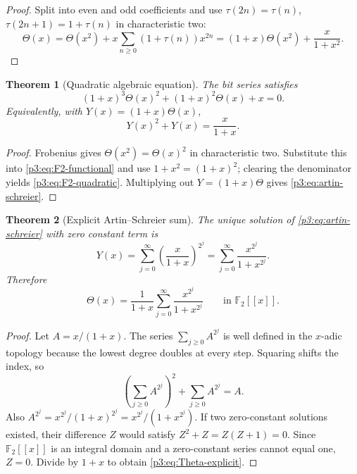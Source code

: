 \documentclass[11pt,oneside]{article}
\newtheorem{theorem}{Theorem}[section]
\theoremstyle{definition}
\theoremstyle{remark}
\newcommand{\F}{\mathbb F}
\newcommand{\1}{\mathbf 1}
\begin{document}
\begin{proof}
Split into even and odd coefficients and use
\(\tau(2n)=\tau(n)\), \(\tau(2n+1)=1+\tau(n)\) in characteristic two:
\[
 \Theta(x)=\Theta(x^2)+x\sum_{n\ge0}(1+\tau(n))x^{2n}
 =(1+x)\Theta(x^2)+\frac{x}{1+x^2}.
\]
\end{proof}

\begin{theorem}[Quadratic algebraic equation]
\label{p3:thm:F2-quadratic}
The bit series satisfies
\begin{equation}
 \boxed{
 (1+x)^3\Theta(x)^2+(1+x)^2\Theta(x)+x=0.}
 \label{p3:eq:F2-quadratic}
\end{equation}
Equivalently, with \(Y(x)=(1+x)\Theta(x)\),
\begin{equation}
 \boxed{
 Y(x)^2+Y(x)=\frac{x}{1+x}.}
 \label{p3:eq:artin-schreier}
\end{equation}
\end{theorem}

\begin{proof}
Frobenius gives \(\Theta(x^2)=\Theta(x)^2\) in characteristic two.  Substitute this into
\eqref{p3:eq:F2-functional} and use \(1+x^2=(1+x)^2\); clearing the denominator yields
\eqref{p3:eq:F2-quadratic}.  Multiplying out \(Y=(1+x)\Theta\) gives
\eqref{p3:eq:artin-schreier}.
\end{proof}

\begin{theorem}[Explicit Artin--Schreier sum]
\label{p3:thm:F2-explicit}
The unique solution of \eqref{p3:eq:artin-schreier} with zero constant term is
\begin{equation}
 Y(x)=\sum_{j=0}^{\infty}\left(\frac{x}{1+x}\right)^{2^j}
     =\sum_{j=0}^{\infty}\frac{x^{2^j}}{1+x^{2^j}}.
 \label{p3:eq:Y-explicit}
\end{equation}
Therefore
\begin{equation}
 \boxed{
 \Theta(x)=\frac1{1+x}
 \sum_{j=0}^{\infty}\frac{x^{2^j}}{1+x^{2^j}}}
 \qquad\text{in }\F_2[[x]].
 \label{p3:eq:Theta-explicit}
\end{equation}
\end{theorem}

\begin{proof}
Let \(A=x/(1+x)\).  The series \(\sum_{j\ge0}A^{2^j}\) is well defined in the
\(x\)-adic topology because the lowest degree doubles at every step.  Squaring shifts the
index, so
\[
 \left(\sum_{j\ge0}A^{2^j}\right)^2+
 \sum_{j\ge0}A^{2^j}=A.
\]
Also \(A^{2^j}=x^{2^j}/(1+x)^{2^j}=x^{2^j}/(1+x^{2^j})\).  If two zero-constant solutions
existed, their difference \(Z\) would satisfy \(Z^2+Z=Z(Z+1)=0\).  Since
\(\F_2[[x]]\) is an integral domain and a zero-constant series cannot equal one, \(Z=0\).
Divide by \(1+x\) to obtain \eqref{p3:eq:Theta-explicit}.
\end{proof}
\end{document}
